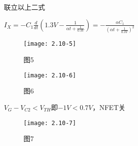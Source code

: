 联立以上二式

$I_X=-C_1\frac{d}{dt}(1.3V-\frac{1}{\alpha t+\frac{1}{0.3V}})=-\frac{\alpha C_1}{(\alpha t+\frac{1}{0.3V})^2}$

\begin{figure}[H] %
	\begin{minipage}{\linewidth}
		\texttt{[image: 2.10-5]}
	\end{minipage}
	\caption*{图5} %
\end{figure}

\scalebox{3}{（c）}

\begin{figure}[H] %
	\begin{minipage}{\linewidth}
		\texttt{[image: 2.10-6]}
	\end{minipage}
	\caption*{图6} %
\end{figure}

$V_G-V_{C2}<V_{TH}$即$-1V<0.7V$，NFET关

\begin{figure}[H] %
	\begin{minipage}{\linewidth}
		\texttt{[image: 2.10-7]}
	\end{minipage}
	\caption*{图7} %
\end{figure}












